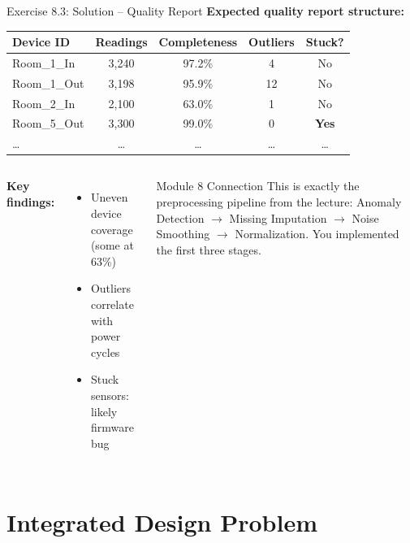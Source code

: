 \documentclass[aspectratio=169,11pt]{beamer}
\begin{document}
\begin{frame}{Exercise 8.3: Solution -- Quality Report}
    \textbf{Expected quality report structure:}

    \vspace{0.2cm}
    \begin{center}
    \footnotesize
    \begin{tabular}{lcccc}
        \toprule
        \textbf{Device ID} & \textbf{Readings} & \textbf{Completeness} & \textbf{Outliers} & \textbf{Stuck?} \\
        \midrule
        Room\_1\_In & 3,240 & 97.2\% & 4 & No \\
        Room\_1\_Out & 3,198 & 95.9\% & 12 & No \\
        Room\_2\_In & 2,100 & 63.0\% & 1 & No \\
        Room\_5\_Out & 3,300 & 99.0\% & 0 & \textbf{Yes} \\
        \ldots & \ldots & \ldots & \ldots & \ldots \\
        \bottomrule
    \end{tabular}
    \normalsize
    \end{center}

    \vspace{0.2cm}
    \begin{columns}
        \textbf{Key findings:}
        \begin{itemize}
            \item Uneven device coverage (some at 63\%)
            \item Outliers correlate with power cycles
            \item Stuck sensors: likely firmware bug
        \end{itemize}

        \begin{alertblock}{Module 8 Connection}
            This is exactly the preprocessing pipeline from the lecture: Anomaly Detection $\rightarrow$ Missing Imputation $\rightarrow$ Noise Smoothing $\rightarrow$ Normalization. You implemented the first three stages.
        \end{alertblock}
    \end{columns}
\end{frame}

\section{Integrated Design Problem}
\end{document}
